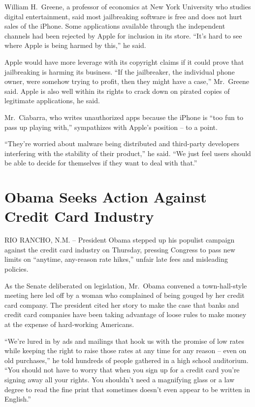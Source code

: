 \documentclass[12pt,a4paper,onecolumn]{article}
\begin{document}
William H.~Greene, a professor of economics at New York University who studies digital
entertainment, said most jailbreaking software is free and does not hurt sales of the iPhone. Some
applications available through the independent channels had been rejected by Apple for inclusion in
its store. ``It's hard to see where Apple is being harmed by this,'' he said.

Apple would have more leverage with its copyright claims if it could prove that jailbreaking is
harming its business. ``If the jailbreaker, the individual phone owner, were somehow trying to
profit, then they might have a case,'' Mr.~Greene said. Apple is also well within its rights to
crack down on pirated copies of legitimate applications, he said.

Mr.~Ciabarra, who writes unauthorized apps because the iPhone is ``too fun to pass up playing
with,'' sympathizes with Apple's position -- to a point.

``They're worried about malware being distributed and third-party developers interfering with the
stability of their product,'' he said. ``We just feel users should be able to decide for themselves
if they want to deal with that.''

\section{Obama Seeks Action Against Credit Card Industry}

RIO RANCHO, N.M. -- President Obama stepped up his populist campaign against the credit card
industry on Thursday, pressing Congress to pass new limits on ``anytime, any-reason rate hikes,''
unfair late fees and misleading policies.

As the Senate deliberated on legislation, Mr.~Obama convened a town-hall-style meeting here led off
by a woman who complained of being gouged by her credit card company. The president cited her story
to make the case that banks and credit card companies have been taking advantage of loose rules to
make money at the expense of hard-working Americans.

``We're lured in by ads and mailings that hook us with the promise of low rates while keeping the
right to raise those rates at any time for any reason -- even on old purchases,'' he told hundreds
of people gathered in a high school auditorium. ``You should not have to worry that when you sign up
for a credit card you're signing away all your rights. You shouldn't need a magnifying glass or a
law degree to read the fine print that sometimes doesn't even appear to be written in English.''
\end{document}
